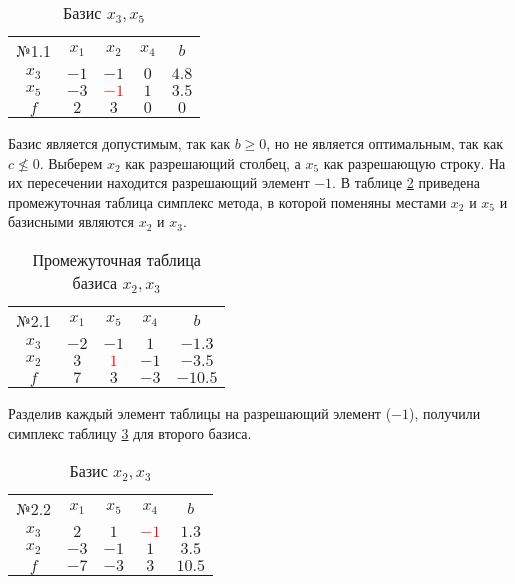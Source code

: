 \begin{table}[H]
\begin{center}
	\def\tabcolsep{15pt}
	\def\arraystretch{1.3}
	\caption{Базис $x_3, x_5$}
	\label{tab:simplex_1}
	\begin{tabular}{|c||c|c|c||c|}
		\hline
		№1.1 & $x_1$ & $x_2$ & $x_4$ & $b$ \\ 
		\hhline{|=#===#=|}
		$x_3$ & $-1$ & $-1$ & $0$ & $4.8$ \\ 
		\hline
		$x_5$ & $-3$ & \textcolor{red}{\boldmath$-1$} & $1$ & $3.5$\\ 
		\hhline{|=#===#=|}
		$f$ & $2$ & $3$ & $0$& $0$ \\ 
		\hline
	\end{tabular}
\end{center}
\end{table}

Базис является допустимым, так как $b \geq 0$, но не является оптимальным, так как $c \nleqslant 0$. Выберем $x_2$ как разрешающий столбец, а $x_5$ как разрешающую строку. На их пересечении находится разрешающий элемент $-1$. В таблице \ref{tab:simplex_2} приведена промежуточная таблица симплекс метода, в которой поменяны местами $x_2$ и $x_5$ и базисными являются $x_2$ и $x_3$.

\begin{table}[H]
\begin{center}
	\def\tabcolsep{14pt}
	\def\arraystretch{1.3}
	\caption{Промежуточная таблица базиса $x_2, x_3$}
	\label{tab:simplex_2}
	\begin{tabular}{|c||c|c|c||c|}
		\hline
		№2.1 & $x_1$ & $x_5$ & $x_4$ & $b$ \\ 
		\hhline{|=#===#=|}
		$x_3$ & $-2$ & $-1$ & $1$ & $-1.3$ \\ 
		\hline
		$x_2$ & $3$ & \textcolor{red}{\boldmath$1$} & $-1$ & $-3.5$\\ 
		\hhline{|=#===#=|}
		$f$ & $7$ & $3$ & $-3$& $-10.5$ \\ 
		\hline
	\end{tabular}
\end{center}
\end{table}

Разделив каждый элемент таблицы на разрешающий элемент ($-1$), получили симплекс таблицу \ref{tab:simplex_3} для второго базиса.

\begin{table}[H]
\begin{center}
	\def\tabcolsep{15pt}
	\def\arraystretch{1.3}
	\caption{Базис $x_2, x_3$}
	\label{tab:simplex_3}
	\begin{tabular}{|c||c|c|c||c|}
		\hline
		№2.2 & $x_1$ & $x_5$ & $x_4$ & $b$ \\ 
		\hhline{|=#===#=|}
		$x_3$ & $2$ & $1$ & \textcolor{red}{\boldmath$-1$} & $1.3$ \\ 
		\hline
		$x_2$ & $-3$ & $-1$ & $1$ & $3.5$\\ 
		\hhline{|=#===#=|}
		$f$ & $-7$ & $-3$ & $3$& $10.5$ \\ 
		\hline
	\end{tabular}
\end{center}
\end{table}

